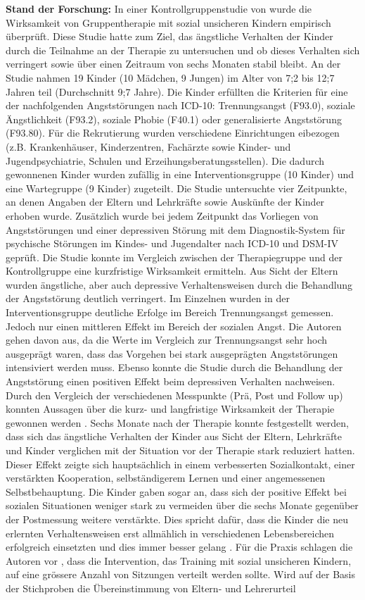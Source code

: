 \textbf{Stand der Forschung:} In einer Kontrollgruppenstudie von 
 wurde die Wirksamkeit von Gruppentherapie mit sozial unsicheren Kindern empirisch überprüft. Diese Studie hatte zum Ziel, das ängstliche Verhalten der Kinder durch die Teilnahme an der Therapie zu untersuchen und ob dieses Verhalten sich verringert sowie über einen Zeitraum von sechs Monaten stabil bleibt. An der Studie nahmen 19 Kinder (10 Mädchen, 9 Jungen) im Alter von 7;2 bis 12;7 Jahren teil (Durchschnitt 9;7 Jahre). Die Kinder erfüllten die Kriterien für eine der nachfolgenden Angststörungen nach ICD-10: Trennungsangst (F93.0), soziale Ängstlichkeit (F93.2), soziale Phobie (F40.1) oder generalisierte Angststörung (F93.80). Für die Rekrutierung wurden verschiedene Einrichtungen eibezogen (z.B. Krankenhäuser, Kinderzentren, Fachärzte sowie Kinder- und Jugendpsychiatrie, Schulen und Erzeihungsberatungsstellen). Die dadurch gewonnenen Kinder wurden zufällig in eine Interventionsgruppe (10 Kinder) und eine Wartegruppe (9 Kinder) zugeteilt. Die Studie untersuchte vier Zeitpunkte, an denen Angaben der Eltern und Lehrkräfte sowie Auskünfte der Kinder erhoben wurde. Zusätzlich wurde bei jedem Zeitpunkt das Vorliegen von Angststörungen und einer depressiven Störung mit dem Diagnostik-System für psychische Störungen im Kindes- und Jugendalter nach ICD-10 und DSM-IV geprüft. Die Studie konnte im Vergleich zwischen der Therapiegruppe und der Kontrollgruppe eine kurzfristige Wirksamkeit ermitteln. Aus Sicht der Eltern wurden ängstliche, aber auch depressive Verhaltensweisen durch die Behandlung der Angststörung deutlich verringert. Im Einzelnen wurden in der Interventionsgruppe deutliche Erfolge im Bereich Trennungsangst gemessen. Jedoch nur einen mittleren Effekt im Bereich der sozialen Angst. Die Autoren gehen davon aus, da die Werte im Vergleich zur Trennungsangst sehr hoch ausgeprägt waren, dass das Vorgehen bei stark ausgeprägten Angststörungen intensiviert werden muss. Ebenso konnte die Studie durch die Behandlung der Angststörung einen positiven Effekt beim depressiven Verhalten nachweisen. Durch den Vergleich der verschiedenen Messpunkte (Prä, Post und Follow up) konnten Aussagen über die kurz- und langfristige Wirksamkeit der Therapie gewonnen werden \cite{Moller:2011}. Sechs Monate nach der Therapie konnte festgestellt werden, dass sich das ängstliche Verhalten der Kinder aus Sicht der Eltern, Lehrkräfte und Kinder verglichen mit der Situation vor der Therapie stark reduziert hatten. Dieser Effekt zeigte sich hauptsächlich in einem verbesserten Sozialkontakt, einer verstärkten Kooperation, selbständigerem Lernen und einer angemessenen Selbstbehauptung. Die Kinder gaben sogar an, dass sich der positive Effekt bei sozialen Situationen weniger stark zu vermeiden über die sechs Monate gegenüber der Postmessung weitere verstärkte. Dies spricht dafür, dass die Kinder die neu erlernten Verhaltensweisen erst allmählich in verschiedenen Lebensbereichen erfolgreich einsetzten und dies immer besser gelang \cite{Moller:2011}. Für die Praxis schlagen die Autoren vor \cite{Petermann:2015}, dass die Intervention, das Training mit sozial unsicheren Kindern, auf eine grössere Anzahl von Sitzungen verteilt werden sollte. Wird auf der Basis der Stichproben die Übereinstimmung von Eltern- und Lehrerurteil 
